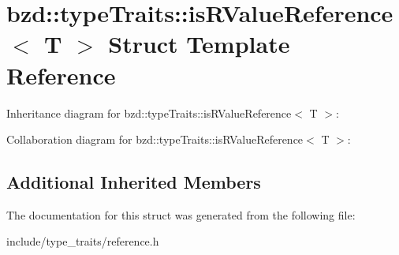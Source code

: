 \hypertarget{structbzd_1_1typeTraits_1_1isRValueReference}{}\section{bzd\+:\+:type\+Traits\+:\+:is\+R\+Value\+Reference$<$ T $>$ Struct Template Reference}
\label{structbzd_1_1typeTraits_1_1isRValueReference}


Inheritance diagram for bzd\+:\+:type\+Traits\+:\+:is\+R\+Value\+Reference$<$ T $>$\+:


Collaboration diagram for bzd\+:\+:type\+Traits\+:\+:is\+R\+Value\+Reference$<$ T $>$\+:
\subsection*{Additional Inherited Members}


The documentation for this struct was generated from the following file\+:\begin{DoxyCompactItemize}
\item 
include/type\+\_\+traits/reference.\+h\end{DoxyCompactItemize}
